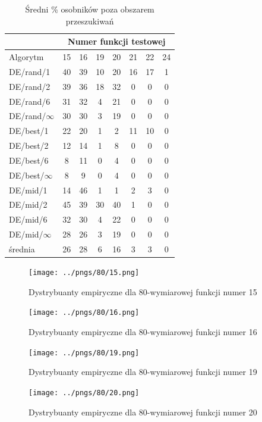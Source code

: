 \documentclass[a4paper,onecolumn,oneside,12pt,wide,floatssmall]{mwrep}
\theoremstyle{definition}
\theoremstyle{plain}%
\theoremstyle{remark}
\begin{document}
\begin{table}[H]
\centering
\begin{tabular}{ l | c | c | c | c | c | c | c }
		 & \multicolumn{7}{c}{Numer funkcji testowej}  \\  \hline
Algorytm         &15& 16& 19& 20& 21& 22& 24 \\ \hline
DE/rand/1	 & 40 & 39 & 10 & 20 & 16 & 17 & 1    \\
DE/rand/2	 & 39 & 36 & 18 & 32 & 0 & 0 & 0  \\
DE/rand/6	 & 31 & 32 & 4 & 21 & 0 & 0 & 0        \\
DE/rand/$\infty$ & 30 & 30 & 3 & 19 & 0 & 0 & 0     \\
DE/best/1	 & 22 & 20 & 1 & 2 & 11 & 10 & 0   \\
DE/best/2	 & 12 & 14 & 1 & 8 & 0 & 0 & 0     \\
DE/best/6	 & 8 & 11 & 0 & 4 & 0 & 0 & 0        \\
DE/best/$\infty$ & 8 & 9 & 0 & 4 & 0 & 0 & 0      \\
DE/mid/1         & 14 & 46 & 1 & 1 & 2 & 3 & 0   \\
DE/mid/2	 & 45 & 39 & 30 & 40 & 1 & 0 & 0      \\
DE/mid/6	 & 32 & 30 & 4 & 22 & 0 & 0 & 0     \\
DE/mid/$\infty$	 & 28 & 26 & 3 & 19 & 0 & 0 & 0     \\ \hline
średnia          & 26 & 28 & 6 & 16 & 3 & 3 & 0 \\  
\end{tabular}
\caption{Średni \% osobników poza obszarem przeszukiwań}
\end{table}

\begin{figure}[H]
\centering
\texttt{[image: ../pngs/80/15.png]}
\caption{Dystrybuanty empiryczne dla 80-wymiarowej funkcji numer 15}
\end{figure}

\begin{figure}[H]
\centering
\texttt{[image: ../pngs/80/16.png]} 
\caption{Dystrybuanty empiryczne dla 80-wymiarowej funkcji numer 16}
\end{figure}

\begin{figure}[H]
\centering
\texttt{[image: ../pngs/80/19.png]}
\caption{Dystrybuanty empiryczne dla 80-wymiarowej funkcji numer 19}
\end{figure}

\begin{figure}[H]
\centering
\texttt{[image: ../pngs/80/20.png]}
\caption{Dystrybuanty empiryczne dla 80-wymiarowej funkcji numer 20}
\end{figure}
\end{document}

